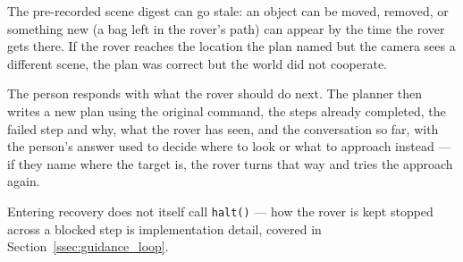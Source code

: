 The pre-recorded scene digest can go stale: an object can be moved, removed, or something new
(a bag left in the rover's path) can appear by the time the rover gets there. If the rover
reaches the location the plan named but the camera sees a different scene, the plan was
correct but the world did not cooperate.

%

The person responds with what the rover should do next. The planner then writes a new plan
using the original command, the steps already completed, the failed step and why, what the
rover has seen, and the conversation so far, with the person's answer used to decide where to
look or what to approach instead — if they name where the target is, the rover turns that way
and tries the approach again.

%

Entering recovery does not itself call \texttt{halt()} — how the rover is kept stopped across
a blocked step is implementation detail, covered in Section~\ref{ssec:guidance_loop}.


